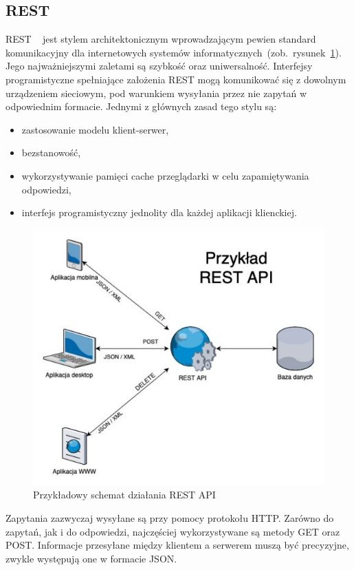 \subsection{REST}
REST ~\cite{REST} jest stylem architektonicznym wprowadzającym pewien standard komunikacyjny dla internetowych systemów informatycznych~(zob.~rysunek~\ref{rys:rest}). Jego najważniejszymi zaletami są szybkość oraz uniwersalność. Interfejsy programistyczne spełniające założenia REST mogą komunikować się z dowolnym urządzeniem sieciowym, pod warunkiem wysyłania przez nie zapytań w odpowiednim formacie. Jednymi z głównych zasad tego stylu są:
\begin{itemize}
	\item zastosowanie modelu klient-serwer,
	\item bezstanowość,
	\item wykorzystywanie pamięci cache przeglądarki w celu zapamiętywania odpowiedzi,
	\item interfejs programistyczny jednolity dla każdej aplikacji klienckiej.
\end{itemize}
\begin{figure}[H]
	\centering\includegraphics[width=\textwidth]{figures/rest}
	\caption{Przykładowy schemat działania REST API~\cite{SchematRest}}\label{rys:rest}
\end{figure}

Zapytania zazwyczaj wysyłane są przy pomocy protokołu HTTP. Zarówno do zapytań, jak i do odpowiedzi, najczęściej wykorzystywane są metody GET oraz POST. Informacje przesyłane między klientem a serwerem muszą być precyzyjne, zwykle występują one w formacie JSON. 

